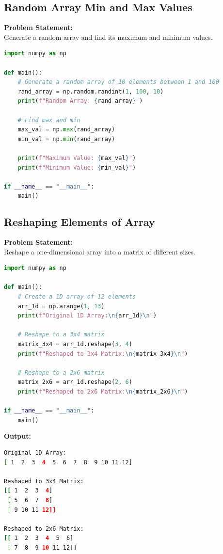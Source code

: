 \documentclass[a4paper,12pt]{article}
\begin{document}
\subsection{Random Array Min and Max Values}
\textbf{Problem Statement:} \\
Generate a random array and find its maximum and minimum values.

\begin{lstlisting}[language=Python, caption={Random Array Min/Max}]
import numpy as np

def main():
    # Generate a random array of 10 elements between 1 and 100
    rand_array = np.random.randint(1, 100, 10)
    print(f"Random Array: {rand_array}")
    
    # Find max and min
    max_val = np.max(rand_array)
    min_val = np.min(rand_array)
    
    print(f"Maximum Value: {max_val}")
    print(f"Minimum Value: {min_val}")

if __name__ == "__main__":
    main()
\end{lstlisting}

\subsection{Reshaping Elements of Array}
\textbf{Problem Statement:} \\
Reshape a one-dimensional array into a matrix of different sizes.

\begin{lstlisting}[language=Python, caption={Reshape array}]
import numpy as np

def main():
    # Create a 1D array of 12 elements
    arr_1d = np.arange(1, 13)
    print(f"Original 1D Array:\n{arr_1d}\n")
    
    # Reshape to a 3x4 matrix
    matrix_3x4 = arr_1d.reshape(3, 4)
    print(f"Reshaped to 3x4 Matrix:\n{matrix_3x4}\n")
    
    # Reshape to a 2x6 matrix
    matrix_2x6 = arr_1d.reshape(2, 6)
    print(f"Reshaped to 2x6 Matrix:\n{matrix_2x6}\n")

if __name__ == "__main__":
    main()
\end{lstlisting}
\vspace{0.5cm}
\textbf{Output:}
\begin{lstlisting}[language=bash]
Original 1D Array:
[ 1  2  3  4  5  6  7  8  9 10 11 12]

Reshaped to 3x4 Matrix:
[[ 1  2  3  4]
 [ 5  6  7  8]
 [ 9 10 11 12]]

Reshaped to 2x6 Matrix:
[[ 1  2  3  4  5  6]
 [ 7  8  9 10 11 12]]
\end{lstlisting}
\end{document}
